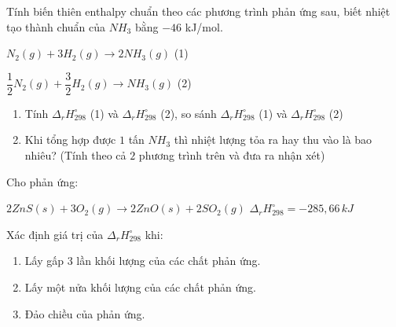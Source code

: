 \documentclass[Main.tex]{subfiles}
\begin{document}
	\begin{bt} Tính biến thiên enthalpy chuẩn theo các phương trình phản ứng sau, biết nhiệt tạo thành chuẩn của $NH_3$ bằng $-46$ kJ/mol.
		
		$N_2(g) + 3H_2(g) \longrightarrow 2NH_3(g)$ (1)
		
		$\dfrac{1}{2}N_2(g) + \dfrac{3}{2}H_2(g) \longrightarrow NH_3(g)$ (2)
		
		\begin{enumerate}
			\item[(a)] Tính $\Delta_r H_{298}^\circ$ (1) và $\Delta_r H_{298}^\circ$ (2), so sánh $\Delta_r H_{298}^\circ$ (1) và $\Delta_r H_{298}^\circ$ (2)
			\item[(b)] Khi tổng hợp được $1$ tấn $NH_3$ thì nhiệt lượng tỏa ra hay thu vào là bao nhiêu? (Tính theo cả $2$ phương trình trên và đưa ra nhận xét)
		\end{enumerate}
	\end{bt}
	\begin{bt} Cho phản ứng:
		
		$2ZnS(s) + 3O_2(g) \longrightarrow 2ZnO(s) + 2SO_2(g)\,\, \Delta_r H_{298}^\circ = -285{,}66\, kJ$
		
		Xác định giá trị của $\Delta_r H_{298}^\circ$ khi:
		\begin{enumerate}
			\item[(a)] Lấy gấp $3$ lần khối lượng của các chất phản ứng.
			\item[(b)] Lấy một nửa khối lượng của các chất phản ứng.
			\item[(c)] Đảo chiều của phản ứng.
		\end{enumerate}
	\end{bt}
\end{document}
